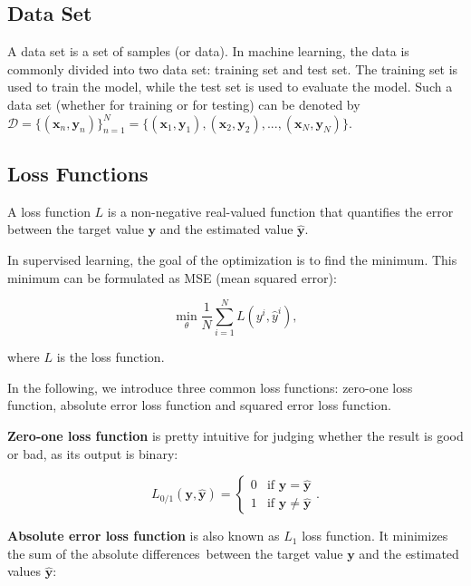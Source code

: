 \documentclass[
	parskip, 			   %
	twoside, 			   %
	DIV=14, 			   %
	BCOR=15.0mm, 		   %
	headsepline, 		   %
	open=right, 		   %
	captions=tableheading, %
	bibliography=totoc,    %
	numbers=noenddot       %
]{scrreprt}
\begin{document}
\subsection{Data Set}
A data set is a set of samples (or data). In machine learning, the data is commonly divided into two data set: training set and test set. The training set is used to train the model, while the test set is used to evaluate the model. Such a data set (whether for training or for testing) can be denoted by $\mathcal{D}=\{ (\mathbf{x}_{n}, \mathbf{y}_{n}) \}_{n=1}^{N} = \{ (\mathbf{x}_{1}, \mathbf{y}_{1}),  (\mathbf{x}_{2}, \mathbf{y}_{2}), ..., (\mathbf{x}_{N}, \mathbf{y}_{N}) \}$.

\subsection{Loss Functions}
A loss function $L$ is a non-negative real-valued function that quantifies the error between the target value $\mathbf{y}$ and the estimated value $\hat{\mathbf{y}}$. 

In supervised learning, the goal of the optimization is to find the minimum. This minimum can be formulated as MSE (mean squared error):

\begin{equation}
    \label{eq:minimum}
    \min _\theta \frac{1}{N} \sum_{i=1}^N L\left(y^i, \hat{y}^i\right),
\end{equation}

where $L$ is the loss function.

In the following, we introduce three common loss functions: zero-one loss function, absolute error loss function and squared error loss function.

\textbf{Zero-one loss function} is pretty intuitive for judging whether the result is good or bad, as its output is binary:

\begin{equation}
    \label{eq:zero_one_loss}
    L_{0/1} (\mathbf{y}, \hat{\mathbf{y}}) = \begin{cases} 0 & \text{if } \mathbf{y}=\hat{\mathbf{y}} \\ 1 & \text{if } \mathbf{y} \neq \hat{\mathbf{y}}
    \end{cases}.
\end{equation}

\textbf{Absolute error loss function} is also known as $L_{1}$ loss function. It minimizes the sum of the absolute differences between the target value $\mathbf{y}$ and the estimated values $\hat{\mathbf{y}}$:
\end{document}
